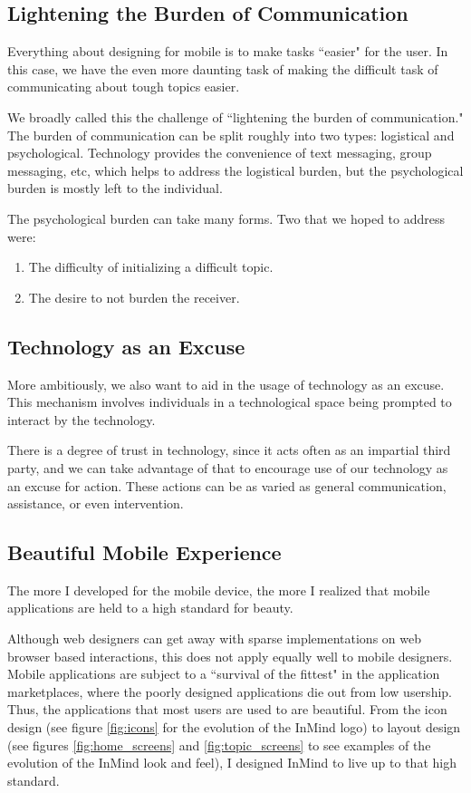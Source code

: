     \subsection{Lightening the Burden of Communication}
    Everything about designing for mobile is to make tasks ``easier" for the user.
    In this case, we have the even more daunting task of making
    the difficult task of communicating about tough topics easier.

    We broadly called this the challenge of ``lightening the burden of communication."
    The burden of communication can be split roughly into two types:
    logistical and psychological.
    Technology provides the convenience of text messaging,
    group messaging, etc, which helps to address the logistical burden,
    but the psychological burden is mostly left to the individual.

    The psychological burden can take many forms.
    Two that we hoped to address were:
    \begin{enumerate}
    \item The difficulty of initializing a difficult topic.
    \item The desire to not burden the receiver.
    \end{enumerate}

    \subsection{Technology as an Excuse}
    More ambitiously, we also want to aid in the usage of technology as an excuse.
    This mechanism involves individuals in a technological space being prompted
    to interact by the technology.
    
    There is a degree of trust in technology, since it acts often as an impartial third party,
    and we can take advantage of that to encourage use of our technology as an excuse for action.
    These actions can be as varied as 
    general communication,
    assistance, or even intervention.

    \subsection{Beautiful Mobile Experience}
    The more I developed for the mobile device,
    the more I realized that mobile applications are held to a high standard for beauty.

    Although web designers can get away with sparse implementations on web browser based
    interactions,
    this does not apply equally well to mobile designers.
    Mobile applications are subject to a ``survival of the fittest" in the application
    marketplaces, where the poorly designed applications die out from low usership.
    Thus, the applications that most users are used to are beautiful.
    From the icon design (see figure \ref{fig:icons} for the evolution of the InMind logo)
    to layout design (see figures \ref{fig:home_screens} and \ref{fig:topic_screens}
    to see examples of the evolution of the InMind look and feel),
    I designed InMind to live up to that high standard.

